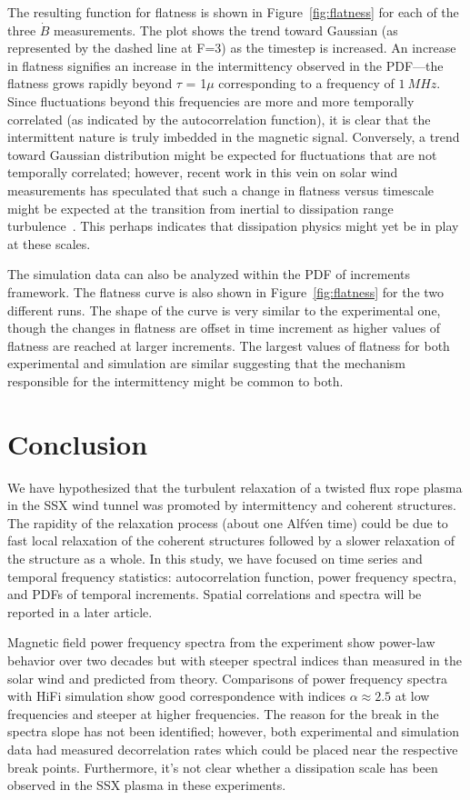 \documentclass[12pt]{iopart}
\begin{document}
The resulting function for flatness is shown in Figure~\ref{fig:flatness} for each of the three $\dot{B}$ measurements. The plot shows the trend toward Gaussian (as represented by the dashed line at F=3) as the timestep is increased. An increase in flatness signifies an increase in the intermittency observed in the PDF---the flatness grows rapidly beyond $\tau$ = 1$\mu$ corresponding to a frequency of $1~MHz$. Since fluctuations beyond this frequencies are more and more temporally correlated (as indicated by the autocorrelation function), it is clear that the intermittent nature is truly imbedded in the magnetic signal. Conversely, a trend toward Gaussian distribution might be expected for fluctuations that are not temporally correlated; however, recent work in this vein on solar wind measurements has speculated that such a change in flatness versus timescale might be expected at the transition from inertial to dissipation range turbulence~\cite{wan12_apj}. This perhaps indicates that dissipation physics might yet be in play at these scales.

The simulation data can also be analyzed within the PDF of increments framework. The flatness curve is also shown in Figure~\ref{fig:flatness} for the two different runs. The shape of the curve is very similar to the experimental one, though the changes in flatness are offset in time increment as higher values of flatness are reached at larger increments. The largest values of flatness for both experimental and simulation are similar suggesting that the mechanism responsible for the intermittency might be common to both.

\section{Conclusion}

We have hypothesized that the turbulent relaxation of a twisted flux rope plasma in the SSX wind tunnel was promoted by intermittency and coherent structures.  The rapidity of the relaxation process (about one Alf\'ven time) could be due to fast local relaxation of the coherent structures followed by a slower relaxation of the structure as a whole.  In this study, we have focused on time series and temporal frequency statistics: autocorrelation function, power frequency spectra, and PDFs of temporal increments.  Spatial correlations and spectra will be reported in a later article.

Magnetic field power frequency spectra from the experiment show power-law behavior over two decades but with steeper spectral indices than measured in the solar wind and predicted from theory. Comparisons of power frequency spectra with HiFi simulation show good correspondence with indices $\alpha \approx 2.5$ at low frequencies and steeper at higher frequencies.  The reason for the break in the spectra slope has not been identified; however, both experimental and simulation data had measured decorrelation rates which could be placed near the respective break points. Furthermore, it's not clear whether a dissipation scale has been observed in the SSX plasma in these experiments.
\end{document}
